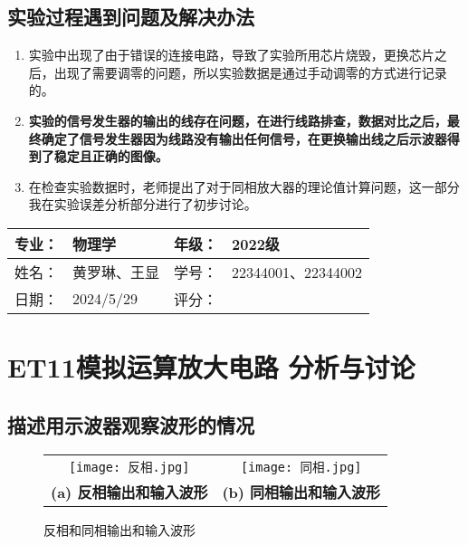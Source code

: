 \documentclass[dvipsnames, svgnames,a4paper,11pt]{article}
\begin{document}
	\subsection{实验过程遇到问题及解决办法}
	\begin{enumerate}
		\item 实验中出现了由于错误的连接电路，导致了实验所用芯片烧毁，更换芯片之后，出现了需要调零的问题，所以实验数据是通过手动调零的方式进行记录的。
		\item \textbf{实验的信号发生器的输出的线存在问题，在进行线路排查，数据对比之后，最终确定了信号发生器因为线路没有输出任何信号，在更换输出线之后示波器得到了稳定且正确的图像。}
		\item 在检查实验数据时，老师提出了对于同相放大器的理论值计算问题，这一部分我在实验误差分析部分进行了初步讨论。
	\end{enumerate}
	
	
	
	\clearpage
	
	\begin{table}
		\renewcommand\arraystretch{1.7}
		\begin{tabularx}{\textwidth}{|X|X|X|X|}
			\hline
			专业：& 物理学 &年级：& 2022级\\
			\hline
			姓名： & 黄罗琳、王显 & 学号：&22344001、22344002 \\
			\hline
			日期：& 2024/5/29 & 评分： &\\
			\hline
		\end{tabularx}
	\end{table}
	
	\section{ET11模拟运算放大电路 \quad\heiti 分析与讨论}
	
	\subsection{描述用示波器观察波形的情况}
	\begin{figure}[H]
		\centering
		\begin{tabular}{cc}
			\texttt{[image: 反相.jpg]} & 
			\texttt{[image: 同相.jpg]} \\
			\textbf{(a) 反相输出和输入波形} & \textbf{(b) 同相输出和输入波形}
		\end{tabular}
		\caption{反相和同相输出和输入波形}
		\label{fig:waveforms}
	\end{figure}
	
\end{document}
